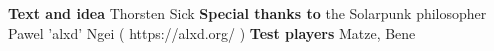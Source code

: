 \newpage
\begin{center}
\textbf{Text and idea}
\newline
Thorsten Sick
\newline
\textbf{Special thanks to}
\newline
the Solarpunk philosopher Pawel 'alxd' Ngei ( https://alxd.org/ )
\newline
\textbf{Test players}
\newline
Matze, Bene
\newline
\end{center}
\newpage